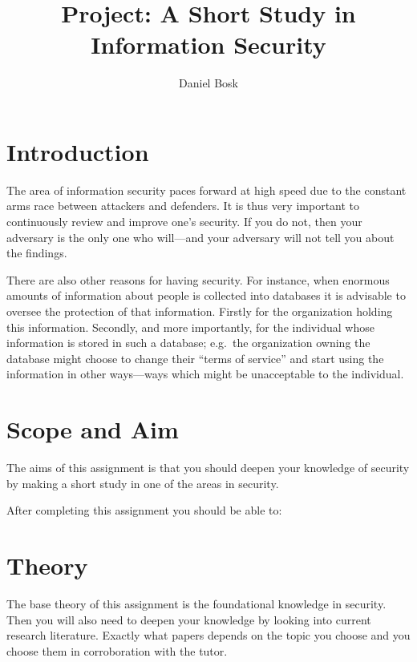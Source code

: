 \documentclass[a4paper]{llncs}
\title{Project: A Short Study in Information Security}
\author{%
  Daniel Bosk
}
\institute{%
  Department of Information and Communication Systems\\
  Mid Sweden University, Sundsvall
}
\begin{document}
\maketitle


\section{Introduction}%
\label{sec:intro}

The area of information security paces forward at high speed due to the 
constant arms race between attackers and defenders.
It is thus very important to continuously review and improve one's security.
If you do not, then your adversary is the only one who will---and your 
adversary will not tell you about the findings.

There are also other reasons for having security.
For instance, when enormous amounts of information about people is collected 
into databases it is advisable to oversee the protection of that information.
Firstly for the organization holding this information.
Secondly, and more importantly, for the individual whose information is stored 
in such a database; e.g.~the organization owning the database might choose to 
change their \enquote{terms of service} and start using the information in 
other ways---ways which might be unacceptable to the individual.


\section{Scope and Aim}%
\label{sec:goal}

The aims of this assignment is that you should deepen your knowledge of 
security by making a short study in one of the areas in security.

After completing this assignment you should be able to:
\begin{itemize}
	
\end{itemize}


\section{Theory}

The base theory of this assignment is the foundational knowledge in security.
Then you will also need to deepen your knowledge by looking into current 
research literature.
Exactly what papers depends on the topic you choose and you choose them in 
corroboration with the tutor.
\end{document}
